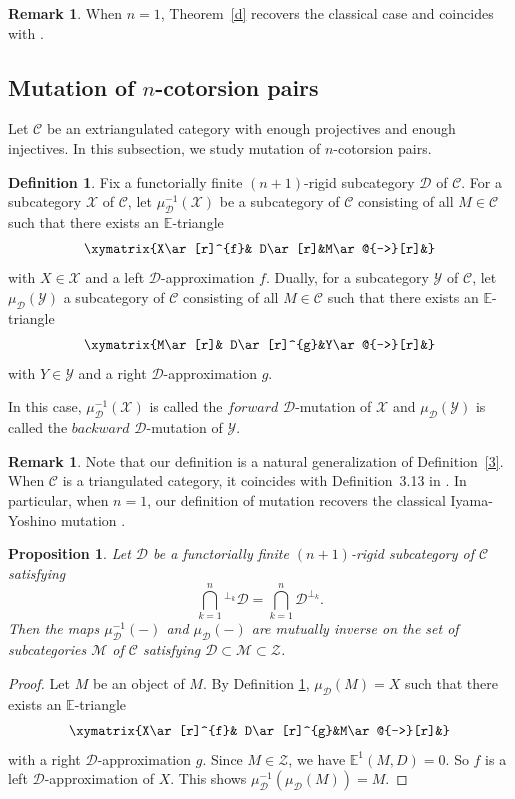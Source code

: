 \documentclass[a4paper,reqno,11pt]{amsart}
\newtheorem{proposition}[theorem]{Proposition}
\theoremstyle{definition}
\newtheorem{definition}[theorem]{Definition}
\newtheorem{remark}[theorem]{Remark}
\def\C{\mathcal{C}}
\def\D{\mathcal{D}}
\def\X{\mathcal{X}}
\def\D{\mathcal{D}}
\def\Y{\mathcal{Y}}
\def\Z{\mathcal {Z}}
\def\M{\mathcal{M}}
\def\E{\mathbb{E}}
\begin{document}
\begin{remark}
When $n=1$, Theorem~\ref{d} recovers the classical case and
 coincides with \cite[Theorem 3.2]{ZZ}.
\end{remark}


\subsection{Mutation of $n$-cotorsion pairs}
Let $\C$ be an extriangulated category with enough projectives and enough injectives. In this subsection, we study mutation of $n$-cotorsion pairs.

\begin{definition}\label{e}
Fix a functorially finite $(n+1)$-rigid subcategory $\D$ of $\C$. For a subcategory $\X$ of $\C$, let $\mu^{-1}_{\D}(\X)$ be a subcategory of $\C$ consisting of all $M\in\C$ such that there exists an $\E$-triangle
 $$\xymatrix{X\ar[r]^{f}& D\ar[r]&M\ar@{-->}[r]&}$$
with $X\in\X$ and a left $\D$-approximation $f$. Dually, for a subcategory $\Y$ of $\C$, let $\mu_{\D}(\Y)$ a subcategory of $\C$ consisting of all $M\in\C$ such that there exists an $\E$-triangle
 $$\xymatrix{M\ar[r]& D\ar[r]^{g}&Y\ar@{-->}[r]&}$$
with  $Y\in\Y$ and a right $\D$-approximation  $g$.

 In this case, $\mu^{-1}_{\D}(\X)$ is called the $forward$ $\D$-mutation of $\X$ and $\mu_{\D}(\Y)$ is called the $backward$ $\D$-mutation of $\Y$.
\end{definition}

\begin{remark}
Note that our definition is a natural generalization of Definition~\ref{3}. When $\C$ is a triangulated category, it coincides with Definition~3.13 in \cite{CZ}. In particular, when $n=1$, our definition of mutation recovers the classical Iyama-Yoshino mutation \cite{IY}.
\end{remark}


\begin{proposition}
Let $\D$ be a functorially finite $(n+1)$-rigid subcategory of $\C$  satisfying $$\bigcap\limits_{k=1}^{n}{^{\perp_k}}\D=\bigcap\limits_{k=1}^{n}\D^{\perp_k}.$$
 Then the maps $\mu^{-1}_{\D}(-)$ and $\mu_{\D}(-)$ are mutually inverse on the set of subcategories $\M$ of $\C$ satisfying $\D\subset\M\subset\Z$.
\end{proposition}

\begin{proof}
Let $M$ be an object of $M$. By Definition \ref{e}, $\mu_{\D}(M)=X$ such that there exists an $\E$-triangle $$\xymatrix{X\ar[r]^{f}& D\ar[r]^{g}&M\ar@{-->}[r]&}$$
with a right $\D$-approximation $g$. Since $M\in\Z$, we have $\E^1(M,D)=0$. So $f$ is a left $\D$-approximation of $X$. This shows $\mu^{-1}_{\D}(\mu_{\D}(M))=M$.
\end{proof}
\end{document}

